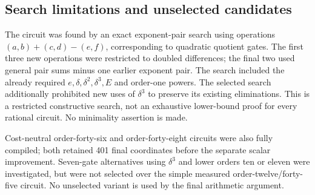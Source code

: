 \subsection{Search limitations and unselected candidates}

The circuit was found by an exact exponent-pair search using operations
$(a,b)+(c,d)-(e,f)$, corresponding to quadratic quotient gates. The
first three new operations were restricted to doubled differences;
the final two used general pair sums minus one earlier exponent pair.
The search included the already required $e,\delta,\delta^2,\delta^3,E$
and order-one powers. The selected search additionally prohibited new
uses of $\delta^3$ to preserve its existing eliminations. This is a
restricted constructive search, not an exhaustive lower-bound proof
for every rational circuit. No minimality assertion is made.

Cost-neutral order-forty-six and order-forty-eight circuits were also
fully compiled; both retained 401 final coordinates before the separate
scalar improvement. Seven-gate alternatives using $\delta^3$ and lower
orders ten or eleven were investigated, but were not selected over the
simple measured order-twelve/forty-five circuit. No unselected variant
is used by the final arithmetic argument.
